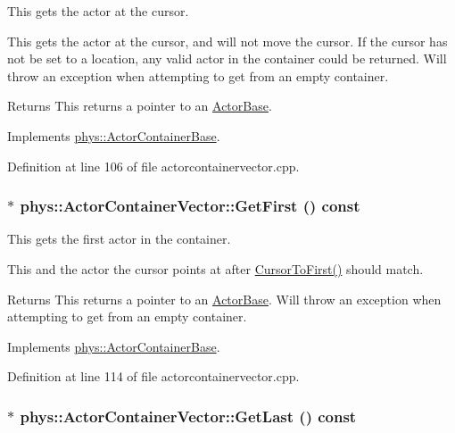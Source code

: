 This gets the actor at the cursor. 

This gets the actor at the cursor, and will not move the cursor. If the cursor has not be set to a location, any valid actor in the container could be returned. Will throw an exception when attempting to get from an empty container. \begin{DoxyReturn}{Returns}
This returns a pointer to an \hyperlink{classphys_1_1ActorBase}{ActorBase}. 
\end{DoxyReturn}


Implements \hyperlink{classphys_1_1ActorContainerBase_a2c8fb86a9e188aece105b2a753ccc19a}{phys::ActorContainerBase}.



Definition at line 106 of file actorcontainervector.cpp.

\hypertarget{classphys_1_1ActorContainerVector_a55ceecd017455f3185aa62798811e3c6}{
\subsubsection[{GetFirst}]{ $\ast$ phys::ActorContainerVector::GetFirst () const}}
\label{d3/d64/classphys_1_1ActorContainerVector_a55ceecd017455f3185aa62798811e3c6}


This gets the first actor in the container. 

This and the actor the cursor points at after \hyperlink{classphys_1_1ActorContainerVector_ad9c2eb2a9405dcf687c86745afc9c031}{CursorToFirst()} should match. \begin{DoxyReturn}{Returns}
This returns a pointer to an \hyperlink{classphys_1_1ActorBase}{ActorBase}. Will throw an exception when attempting to get from an empty container. 
\end{DoxyReturn}


Implements \hyperlink{classphys_1_1ActorContainerBase_ae703482d84a9c6726e28a8f26418b161}{phys::ActorContainerBase}.



Definition at line 114 of file actorcontainervector.cpp.

\hypertarget{classphys_1_1ActorContainerVector_a211f6e419ef0b753cecf2c662a54511e}{
\subsubsection[{GetLast}]{ $\ast$ phys::ActorContainerVector::GetLast () const}}
\label{d3/d64/classphys_1_1ActorContainerVector_a211f6e419ef0b753cecf2c662a54511e}


